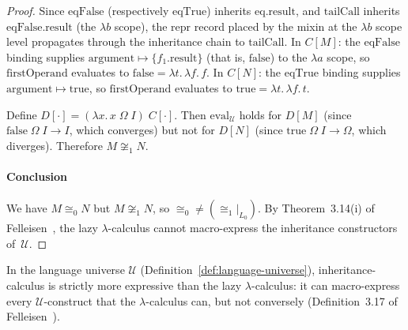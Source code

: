 \begin{proof}
  Since $\mathrm{eqFalse}$ (respectively $\mathrm{eqTrue}$)
  inherits $\mathrm{eq}.\mathrm{result}$,
  and $\mathrm{tailCall}$ inherits
  $\mathrm{eqFalse}.\mathrm{result}$ (the $\lambda b$
  scope), the $\mathrm{repr}$ record placed by the mixin
  at the $\lambda b$ scope level propagates through
  the inheritance chain to $\mathrm{tailCall}$.
  In $C[M]$: the $\mathrm{eqFalse}$ binding supplies
  $\mathrm{argument} \mapsto \{f_1.\mathrm{result}\}$
  (that is, $\mathrm{false}$) to the $\lambda a$ scope, so
  $\mathrm{firstOperand}$ evaluates to
  $\mathrm{false} = \lambda t.\,\lambda f.\, f$.
  In $C[N]$: the $\mathrm{eqTrue}$ binding supplies
  $\mathrm{argument} \mapsto \mathrm{true}$, so
  $\mathrm{firstOperand}$ evaluates to
  $\mathrm{true} = \lambda t.\,\lambda f.\, t$.

  Define $D[\cdot] = (\lambda x.\, x\;\Omega\;I)\;
  C[\cdot]$.
  Then $\mathrm{eval}_{\mathscr{U}}$ holds for $D[M]$
  (since $\mathrm{false}\;\Omega\;I \to I$, which
  converges)
  but not for $D[N]$
  (since $\mathrm{true}\;\Omega\;I \to \Omega$, which
  diverges).
  Therefore $M \not\cong_1 N$.

  \paragraph{Conclusion}
  We have $M \cong_0 N$ but $M \not\cong_1 N$, so
  ${\cong_0} \neq {(\cong_1|_{L_0})}$.
  By Theorem~3.14(i) of
  Felleisen~\cite{felleisen1991-expressive-power},
  the lazy $\lambda$-calculus cannot macro-express the
  inheritance constructors of~$\mathscr{U}$.
\end{proof}

\begin{theorem}
  \label{thm:expressive-asymmetry}
  In the language universe $\mathscr{U}$
  (Definition~\ref{def:language-universe}),
  inheritance-calculus is strictly more expressive than
  the lazy $\lambda$-calculus: it can macro-express every
  $\mathscr{U}$-construct that the $\lambda$-calculus
  can, but not conversely
  (Definition~3.17 of
  Felleisen~\cite{felleisen1991-expressive-power}).
\end{theorem}

